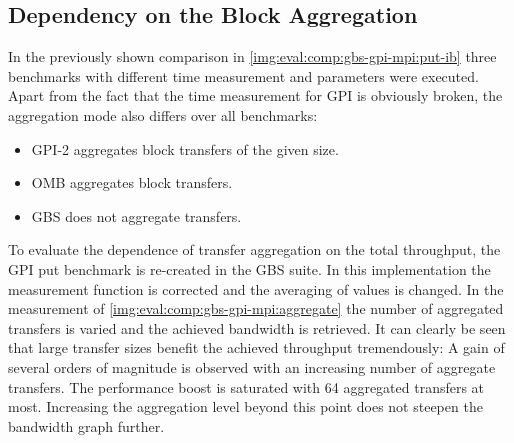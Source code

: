 \subsection{Dependency on the Block Aggregation}

In the previously shown comparison in \autoref{img:eval:comp:gbs-gpi-mpi:put-ib} three benchmarks with different time measurement and parameters were executed. Apart from the fact that the time measurement for \ac{GPI} is obviously broken, the aggregation mode also differs over all benchmarks: 
\begin{itemize}
	\item \ac{GPI}-2 aggregates  block transfers of the given size.
	\item \ac{OMB} aggregates  block transfers.
	\item \ac{GBS} does not aggregate transfers.
\end{itemize}

To evaluate the dependence of transfer aggregation on the total throughput, the \ac{GPI} put benchmark is re-created in the \ac{GBS} suite. In this implementation the measurement function is corrected and the averaging of values is changed. In the measurement of \autoref{img:eval:comp:gbs-gpi-mpi:aggregate} the number of aggregated transfers is varied and the achieved bandwidth is retrieved. It can clearly be seen that large transfer sizes benefit the achieved throughput tremendously: A gain of several orders of magnitude is observed with an increasing number of aggregate transfers. The performance boost is saturated with 64 aggregated transfers at most. Increasing the aggregation level beyond this point does not steepen the bandwidth graph further.



